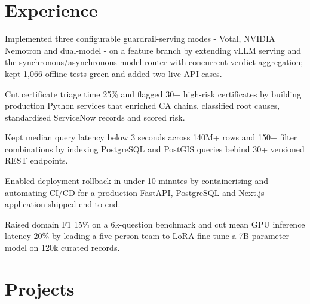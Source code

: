 \vfill
\section{Experience}

\begin{resumeBullets}
  \item Implemented three configurable guardrail-serving modes - Votal, NVIDIA Nemotron and dual-model - on a feature branch by extending vLLM serving and the synchronous/asynchronous model router with concurrent verdict aggregation; kept 1,066 offline tests green and added two live API cases.
\end{resumeBullets}

\begin{resumeBullets}
  \item Cut certificate triage time 25\% and flagged 30+ high-risk certificates by building production Python services that enriched CA chains, classified root causes, standardised ServiceNow records and scored risk.
\end{resumeBullets}

\begin{resumeBullets}
  \item Kept median query latency below 3 seconds across 140M+ rows and 150+ filter combinations by indexing \mbox{PostgreSQL} and \mbox{PostGIS} queries behind 30+ versioned REST endpoints.
  \item Enabled deployment rollback in under 10 minutes by containerising and automating CI/CD for a production FastAPI, PostgreSQL and Next.js application shipped end-to-end.
\end{resumeBullets}

\begin{resumeBullets}
  \item Raised domain F1 15\% on a 6k-question benchmark and cut mean GPU inference latency 20\% by leading a five-person team to LoRA fine-tune a 7B-parameter model on 120k curated records.
\end{resumeBullets}

\vfill
\section{Projects}

